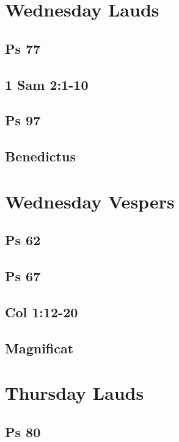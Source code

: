 \section{Wednesday Lauds}

\subsection{Ps 77}

\subsection{1 Sam 2:1-10}

\subsection{Ps 97}

\subsection{Benedictus}


\section{Wednesday Vespers}

\subsection{Ps 62}

\subsection{Ps 67}

\subsection{Col 1:12-20}

\subsection{Magnificat}


\section{Thursday Lauds}

\subsection{Ps 80}

